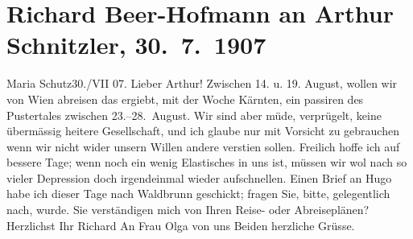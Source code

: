 

         
         \renewcommand{\erwaehntePersonen}{Personen: Hugo von Hofmannsthal, Olga Schnitzler}
         \renewcommand{\erwaehnteOrte}{Orte: Kärnten, Maria Schutz, Pustertal, Welsberg-Taisten, Wien, Wildbad Waldbrunn}
         \renewcommand{\erwaehnteWerke}{}
               \section[Richard Beer-Hofmann an Arthur Schnitzler, 30. 7. 1907]{ Richard Beer-Hofmann an Arthur Schnitzler, 30. 7. 1907}\nopagebreak{}\rehead{ }\begin{ledgroupsized}[t]{13cm}\normalsize\beginnumbering \toendnotes[C]{\smallbreak\pagebreak[2]} 
\toendnotes[C]{\smallbreak}\pstart
           \raggedleft{}{\pb}Maria Schutz30./VII 07.\pend
           \pstart
           Lieber Arthur! Zwischen 14. u. 19. August,
               wollen wir von Wien abreisen das ergiebt, mit der
               Woche Kärnten, ein passiren des Pustertales zwischen 23.–28. August.\pend
           \pstart
           Wir sind aber müde, verprügelt, keine übermässig heitere Gesellschaft, und ich glaube
               nur mit Vorsicht zu gebrauchen wenn wir nicht wider unsern Willen andere versti{\geminationm}en sollen.\pend
           \pstart
           {\pb}Freilich hoffe ich auf bessere
               Tage; wenn noch ein wenig Elastisches in uns ist, müssen wir wol nach so vieler
               Depression doch irgendeinmal wieder aufschnellen.\pend
           \pstart
           Einen Brief an Hugo habe ich dieser Tage nach Waldbrunn geschickt; fragen Sie, bitte, gelegentlich
               nach, \label{K_L01697_1v}\label{K_L01697_1h} wurde.\pend
           \pstart
           Sie verständigen mich von Ihren Reise- oder Abreiseplänen?\pend
           \pstart Herzlichst Ihr \spacefill\mbox{Richard}\pend{}\pstart
           An Frau Olga von uns Beiden herzliche Grüsse.\pend
           

\end{ledgroupsized}
